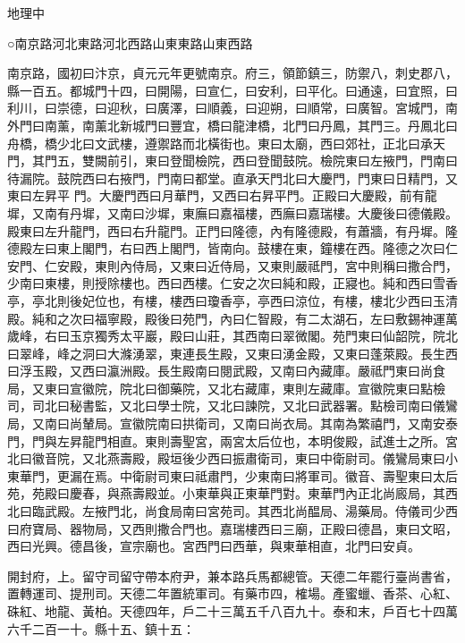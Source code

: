 
\begin{pinyinscope}

 地理中



 ○南京路河北東路河北西路山東東路山東西路



 南京路，國初曰汴京，貞元元年更號南京。府三，領節鎮三，防禦八，刺史郡八，縣一百五。都城門十四，曰開陽，曰宣仁，曰安利，曰平化。曰通遠，曰宜照，曰利川，曰崇德，曰迎秋，曰廣澤，曰順義，曰迎朔，曰順常，曰廣智。宮城門，南外門曰南薰，南薰北新城門曰豐宜，橋曰龍津橋，北門曰丹鳳，其門三。丹鳳北曰舟橋，橋少北曰文武樓，遵禦路而北橫街也。東曰太廟，西曰郊社，正北曰承天門，其門五，雙闕前引，東曰登聞檢院，西曰登聞鼓院。檢院東曰左掖門，門南曰待漏院。鼓院西曰右掖門，門南曰都堂。直承天門北曰大慶門，門東曰日精門，又東曰左昇平
 門。大慶門西曰月華門，又西曰右昇平門。正殿曰大慶殿，前有龍墀，又南有丹墀，又南曰沙墀，東廡曰嘉福樓，西廡曰嘉瑞樓。大慶後曰德儀殿。殿東曰左升龍門，西曰右升龍門。正門曰隆德，內有隆德殿，有蕭牆，有丹墀。隆德殿左曰東上閣門，右曰西上閣門，皆南向。鼓樓在東，鐘樓在西。隆德之次曰仁安門、仁安殿，東則內侍局，又東曰近侍局，又東則嚴祗門，宮中則稱曰撒合門，少南曰東樓，則授除樓也。西曰西樓。仁安之次曰純和殿，正寢也。純和西曰雪香亭，亭北則後妃位也，有樓，樓西曰瓊香亭，亭西曰涼位，有樓，樓北少西曰玉清殿。純和之次曰福寧殿，殿後曰苑門，內曰仁智殿，有二太湖石，左曰敷錫神運萬歲峰，右曰玉京獨秀太平巖，殿曰山莊，其西南曰翠微閣。苑門東曰仙韶院，院北曰翠峰，峰之洞曰大滌湧翠，東連長生殿，又東曰湧金殿，又東曰蓬萊殿。長生西曰浮玉殿，又西曰瀛洲殿。長生殿南曰閱武殿，又南曰內藏庫。嚴祗門東曰尚食局，又東曰宣徽院，院北曰御藥院，又北右藏庫，東則左藏庫。宣徽院東曰點檢司，司北曰秘書監，又北曰學士院，又北曰諫院，又北曰武器署。點檢司南曰儀鸞局，又南曰尚輦局。宣徽院南曰拱衛司，又南曰尚衣局。其南為繁禧門，又南安泰
 門，門與左昇龍門相直。東則壽聖宮，兩宮太后位也，本明俊殿，試進士之所。宮北曰徽音院，又北燕壽殿，殿垣後少西曰振肅衛司，東曰中衛尉司。儀鸞局東曰小東華門，更漏在焉。中衛尉司東曰祗肅門，少東南曰將軍司。徽音、壽聖東曰太后苑，苑殿曰慶春，與燕壽殿並。小東華與正東華門對。東華門內正北尚廄局，其西北曰臨武殿。左掖門北，尚食局南曰宮苑司。其西北尚醖局、湯藥局。侍儀司少西曰府寶局、器物局，又西則撒合門也。嘉瑞樓西曰三廟，正殿曰德昌，東曰文昭，西曰光興。德昌後，宣宗廟也。宮西門曰西華，與東華相直，北門曰安貞。



 開封府，上。留守司留守帶本府尹，兼本路兵馬都總管。天德二年罷行臺尚書省，置轉運司、提刑司。天德二年置統軍司。有藥市四，榷場。產蜜蠟、香茶、心紅、硃紅、地龍、黃柏。天德四年，戶二十三萬五千八百九十。泰和末，戶百七十四萬
 六千二百一十。縣十五、鎮十五：




\end{pinyinscope}
